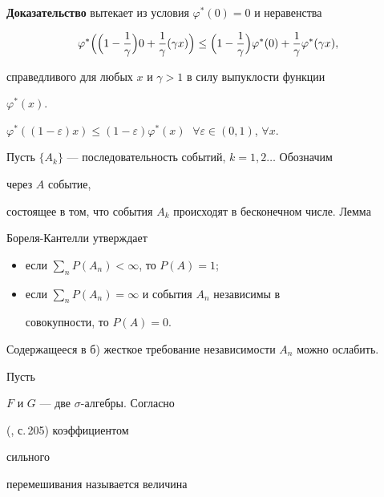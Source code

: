  


{\bf Доказательство} вытекает из условия $\varphi^*(0)=0$ и неравенства 


$$ 


\varphi^*\Bigl(\Bigl(1-\frac{1}{\gamma}\Bigr)0+\frac{1}{\gamma} 


(\gamma x)\Bigr)\le\Bigl(1-\frac{1}{\gamma}\Bigr)\varphi^*(0) 


+\frac{1}{\gamma}\varphi^*(\gamma x), 


$$


справедливого для любых $x$ и $\gamma>1$ в силу выпуклости функции 


$\varphi^*(x)$. 


 


\begin{cors} $\varphi^*((1-\varepsilon)x)\le(1-\varepsilon) 


\varphi^*(x)\;$ $\forall\varepsilon\in(0,1)$, $\forall x$. 


\end{cors} 


 


Пусть $\{A_k\}$ --- последовательность событий, $k=1,2\dotsc$ Обозначим 


через $A$ событие, 


состоящее в том, что события $A_k$ происходят в бесконечном числе. Лемма 


Бореля-Кантелли утверждает 


\begin{itemize} 


\item[а)] если $\sum\limits_nP(A_n)<\infty$, то $P(A)=1$; 


\item[б)] если $\sum\limits_nP(A_n)=\infty$ и события $A_n$ независимы в 


совокупности, то $P(A)=0$. 


\end{itemize} 


Содержащееся в б) жесткое требование независимости $A_n$ можно ослабить. 


Пусть 


$F$ и $G$ --- две $\sigma$-алгебры. Согласно 


(\cite{Ibr}, с.\,205) коэффициентом 


сильного 


перемешивания называется величина 


